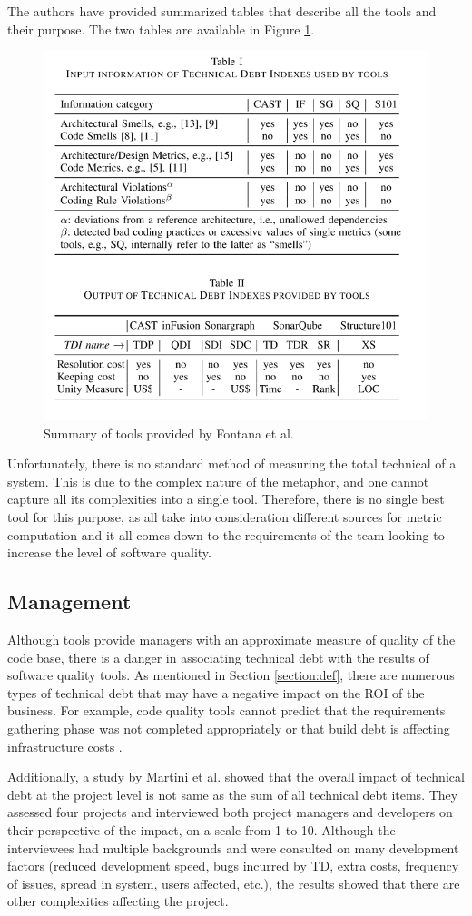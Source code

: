 \documentclass{mprop}
\begin{document}
The authors have provided summarized tables that describe all the tools and
their purpose. The two tables are available in Figure \ref{fig:tools-tables}.

\begin{figure}
	\centering
	\includegraphics[width=0.5\linewidth]{visualisations/tools-table.png}
	\caption{Summary of tools provided by Fontana et al.}
	\label{fig:tools-tables}
\end{figure}

Unfortunately, there is no standard method of measuring the total technical of a
system. This is due to the complex nature of the metaphor, and one cannot capture
all its complexities into a single tool. Therefore, there is no single best tool
for this purpose, as all take into consideration different sources for metric
computation and it all comes down to the requirements of the team looking to
increase the level of software quality.

\subsection{Management}

Although tools provide managers with an approximate measure of quality of the
code base, there is a danger in associating technical debt with the results of
software quality tools. As mentioned in Section \ref{section:def}, there
are numerous types of technical debt that may have a negative impact on the ROI
of the business. For example, code quality tools cannot predict that the
requirements gathering phase was not completed appropriately or that build debt
is affecting infrastructure costs \cite{Morgenthaler2012}.

Additionally, a study by Martini et al. \cite{Martini2017} showed that the
overall impact of technical debt at the project level is not same as the sum of
all technical debt items. They assessed four projects and interviewed both
project managers and developers on their perspective of the impact, on a scale
from 1 to 10. Although the interviewees had multiple backgrounds and were
consulted on many development factors (reduced development speed, bugs incurred
by TD, extra costs, frequency of issues, spread in system, users affected,
etc.), the results showed that there are other complexities affecting the
project.
\end{document}
